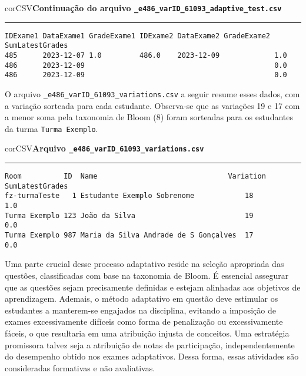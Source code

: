\begin{myboxCode}{corCSV}{\textbf{Continuação do arquivo \texttt{\_e486\_varID\_61093\_adaptive\_test.csv}}}\vspace{3mm}
  \hrule
  \begin{verbatim}
IDExame1 DataExame1 GradeExame1 IDExame2 DataExame2 GradeExame2 SumLatestGrades
485      2023-12-07 1.0         486.0    2023-12-09             1.0 
486      2023-12-09                                             0.0 
486      2023-12-09                                             0.0
\end{verbatim}
\end{myboxCode}

O arquivo \verb|_e486_varID_61093_variations.csv| a seguir resume esses dados, com a variação sorteada para cada estudante. Observa-se que as variações 19 e 17 com a menor soma pela taxonomia de Bloom (8) foram sorteadas para os estudantes da turma \verb|Turma Exemplo|.

\begin{myboxCode}{corCSV}{\textbf{Arquivo \texttt{\_e486\_varID\_61093\_variations.csv}}}\vspace{3mm}
\hrule
\begin{verbatim}
Room          ID  Name                               Variation  SumLatestGrades
fz-turmaTeste   1 Estudante Exemplo Sobrenome            18         1.0
Turma Exemplo 123 João da Silva                          19         0.0
Turma Exemplo 987 Maria da Silva Andrade de S Gonçalves  17         0.0
\end{verbatim}
\end{myboxCode}


Uma parte crucial desse processo adaptativo reside na seleção apropriada das questões, classificadas com base na taxonomia de Bloom. É essencial assegurar que as questões sejam precisamente definidas e estejam alinhadas aos objetivos de aprendizagem. Ademais, o método adaptativo em questão deve estimular os estudantes a manterem-se engajados na disciplina, evitando a imposição de exames excessivamente difíceis como forma de penalização ou excessivamente fáceis, o que resultaria em uma atribuição injusta de conceitos. Uma estratégia promissora talvez seja a atribuição de notas de participação, independentemente do desempenho obtido nos exames adaptativos. Dessa forma, essas atividades são consideradas formativas e não avaliativas.


